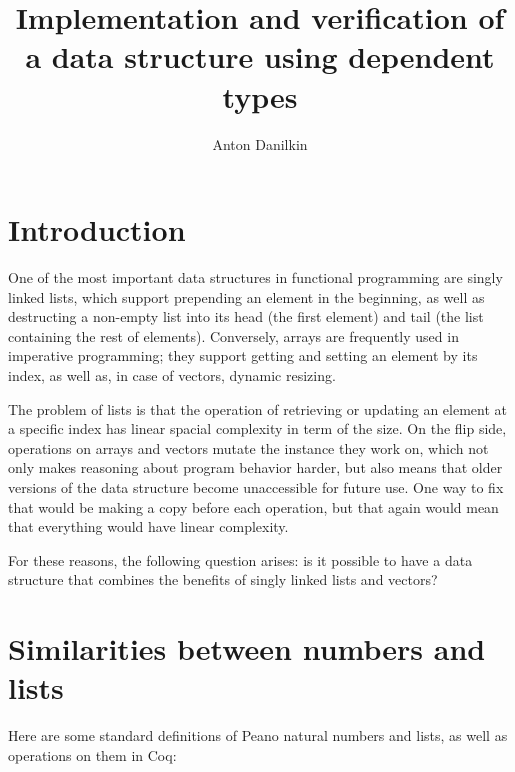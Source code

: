 \documentclass{article}
\title{Implementation and verification of a data structure using dependent types}
\author{Anton Danilkin}
\newenvironment{no_space_center}
    {\parskip=0pt\par\nopagebreak\centering}
    {\par\noindent\ignorespacesafterend}
\begin{document}
\begin{no_space_center}
    \begin{minipage}{10cm}
        \maketitle
    \end{minipage}
\end{no_space_center}

\begin{abstract}
    
\end{abstract}

\vspace{10cm}

\section{Introduction}

One of the most important data structures in functional programming are singly linked lists, which support prepending an element in the beginning, as well as destructing a non-empty list into its head (the first element) and tail (the list containing the rest of elements). Conversely, arrays are frequently used in imperative programming; they support getting and setting an element by its index, as well as, in case of vectors, dynamic resizing.

The problem of lists is that the operation of retrieving or updating an element at a specific index has linear spacial complexity in term of the size. On the flip side, operations on arrays and vectors mutate the instance they work on, which not only makes reasoning about program behavior harder, but also means that older versions of the data structure become unaccessible for future use. One way to fix that would be making a copy before each operation, but that again would mean that everything would have linear complexity.

For these reasons, the following question arises: is it possible to have a data structure that combines the benefits of singly linked lists and vectors?

\section{Similarities between numbers and lists}

Here are some standard definitions of Peano natural numbers and lists, as well as operations on them in Coq:
\end{document}

